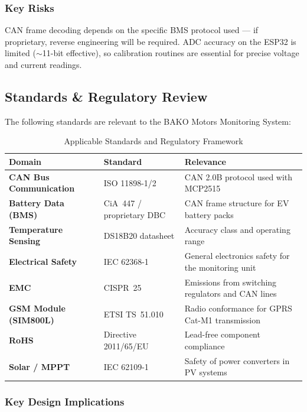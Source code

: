 \subsubsection*{Key Risks}

CAN frame decoding depends on the specific BMS protocol used --- if proprietary, reverse engineering will be required. ADC accuracy on the ESP32 is limited ($\sim$11-bit effective), so calibration routines are essential for precise voltage and current readings.

\subsection{Standards \& Regulatory Review}

The following standards are relevant to the BAKO Motors Monitoring System:

\begin{table}[H]
\centering
\caption{Applicable Standards and Regulatory Framework}
\label{tab:standards}
\begin{tabular}{>{\bfseries}p{3.0cm} p{3.4cm} p{6.8cm}}
\toprule
Domain & Standard & Relevance \\
\midrule
CAN Bus Communication & ISO 11898-1/2          & CAN 2.0B protocol used with MCP2515 \\
Battery Data (BMS)     & CiA~447 / proprietary DBC & CAN frame structure for EV battery packs \\
Temperature Sensing    & DS18B20 datasheet      & Accuracy class and operating range \\
Electrical Safety      & IEC 62368-1            & General electronics safety for the monitoring unit \\
EMC                    & CISPR~25               & Emissions from switching regulators and CAN lines \\
GSM Module (SIM800L)  & ETSI TS~51.010         & Radio conformance for GPRS Cat-M1 transmission \\
RoHS                   & Directive 2011/65/EU   & Lead-free component compliance \\
Solar / MPPT           & IEC 62109-1            & Safety of power converters in PV systems \\
\bottomrule
\end{tabular}
\end{table}

\subsubsection*{Key Design Implications}

